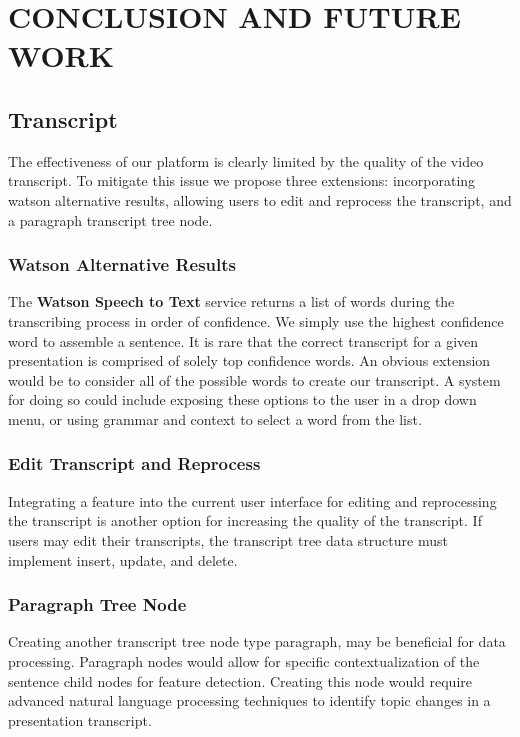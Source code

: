 \section*{CONCLUSION AND FUTURE WORK}
\label{chapterfuturework}

\subsection*{Transcript}
The effectiveness of our platform is clearly limited by the quality of the video
transcript. To mitigate this issue we propose three extensions: incorporating
watson alternative results, allowing users to edit and reprocess the transcript,
and a paragraph transcript tree node.

\subsubsection*{Watson Alternative Results}

The \textbf{Watson Speech to Text} service returns a list of words during the
transcribing process in order of confidence. We simply use the highest
confidence word to assemble a sentence. It is rare that the correct transcript
for a given presentation is comprised of solely top confidence words. An obvious
extension would be to consider all of the possible words to create our
transcript. A system for doing so could include exposing these options to the
user in a drop down menu, or using grammar and context to select a word from the
list.

\subsubsection*{Edit Transcript and Reprocess}
Integrating a feature into the current user interface for editing and
reprocessing the transcript is another option for increasing the quality of the
transcript. If users may edit their transcripts, the transcript tree data
structure must implement insert, update, and delete.

\subsubsection*{Paragraph Tree Node}
Creating another transcript tree node type paragraph, may be beneficial for data
processing. Paragraph nodes would allow for specific contextualization of the
sentence child nodes for feature detection. Creating this node would require
advanced natural language processing techniques to identify topic changes in a
presentation transcript.

